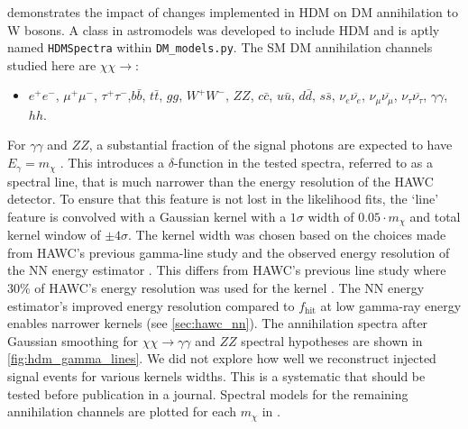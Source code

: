  demonstrates the impact of changes implemented in HDM on DM
annihilation to W bosons.
A class in astromodels was developed to include HDM and is aptly named \texttt{HDMSpectra} within \texttt{DM\_models.py}.
The SM DM annihilation channels studied here are $\chi\chi \rightarrow$:
\begin{itemize}
    \item[] $e^+e^-$, $\mu^+\mu^-$, $\tau^+\tau^-$,$b\bar{b}$, $t\bar{t}$, $gg$, $W^+W^-$, $ZZ$, $c\bar{c}$, $u\bar{u}$, $d\bar{d}$, $s\bar{s}$, $\nu_e \overline{\nu_e}$, $\nu_\mu \overline{\nu_\mu}$, $\nu_\tau \overline{\nu_\tau}$, $\gamma\gamma$, $hh$.
\end{itemize}
For $\gamma\gamma$ and $ZZ$, a substantial fraction of the signal photons are expected to have $E_\gamma = m_\chi$ \cite{Rodd:HDM_spec}.
This introduces a $\delta$-function in the tested spectra, referred to as a spectral line, that is much narrower than the energy resolution of the HAWC detector.
To ensure that this feature is not lost in the likelihood fits, the `line' feature is convolved with a Gaussian kernel with a $1\sigma$ width of $0.05 \cdot m_\chi$ and total kernel window of $\pm4\sigma$.
The kernel width was chosen based on the choices made from HAWC's previous gamma-line study \cite{HAWC_dm_gammalines} and the observed energy resolution of the NN energy estimator \cite{100TEV_Crab_HAWC}.
This differs from HAWC's previous line study where 30\% of HAWC's energy resolution was used for the kernel \cite{HAWC_dm_gammalines}.
The NN energy estimator's improved energy resolution compared to $f_\mathrm{hit}$ at low gamma-ray energy enables narrower kernels \cite{Rodd:HDM_spec} (see \cref{sec:hawc_nn}).
The annihilation spectra after Gaussian smoothing for $\chi\chi \rightarrow \gamma\gamma$ and $ZZ$ spectral hypotheses are shown in \cref{fig:hdm_gamma_lines}.
We did not explore how well we reconstruct injected signal events for various kernels widths.
This is a systematic that should be tested before publication in a journal.
Spectral models for the remaining annihilation channels are plotted for each $m_\chi$ in .

